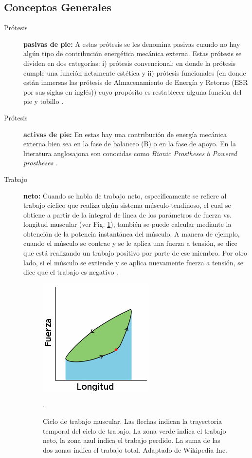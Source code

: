 \documentclass[12pt,english]{article}
\begin{document}
\subsection*{Conceptos Generales}
\begin{description}
\item [{Prótesis}] \textbf{pasivas de pie:} A estas prótesis se les denomina
pasivas cuando no hay algún tipo de contribución energética mecánica
externa. Estas prótesis se dividen en dos categorías: i) prótesis
convencional: en donde la prótesis cumple una función netamente estética
y ii) prótesis funcionales (en donde están inmersas las prótesis de
Almacenamiento de Energía y Retorno (ESR por sus siglas en inglés))
cuyo propósito es restablecer alguna función del pie y tobillo \cite{Versluys2009}.
\item [{Prótesis}] \textbf{activas de pie: }En estas hay una contribución
de energía mecánica externa bien sea en la fase de balanceo (B) o
en la fase de apoyo. En la literatura anglosajona son conocidas como
\emph{Bionic Prostheses} ó \emph{Powered prostheses} \cite{Cherelle2014a}.
\item [{Trabajo}] \textbf{neto: }Cuando se habla de trabajo neto, específicamente
se refiere al trabajo cíclico que realiza algún sistema músculo-tendinoso,
el cual se obtiene a partir de la integral de linea de los parámetros
de fuerza vs. longitud muscular (ver Fig. \ref{fig:Ciclo-de-trabajo}),
también se puede calcular mediante la obtención de la potencia instantánea
del músculo. A manera de ejemplo, cuando el músculo se contrae y se
le aplica una fuerza a tensión, se dice que está realizando un trabajo
positivo por parte de ese miembro. Por otro lado, si el músculo se
extiende y se aplica nuevamente fuerza a tensión, se dice que el trabajo
es negativo \cite{Altringham1990}. 


\begin{figure}
\centering{}\includegraphics[scale=0.5]{workloop}\caption{\label{fig:Ciclo-de-trabajo}Ciclo de trabajo muscular. Las flechas
indican la trayectoria temporal del ciclo de trabajo. La zona verde
indica el trabajo neto, la zona azul indica el trabajo perdido. La
suma de las dos zonas indica el trabajo total. Adaptado de Wikipedia Inc. \cite{workloop}}.
\end{figure}



\end{description}
\end{document}
